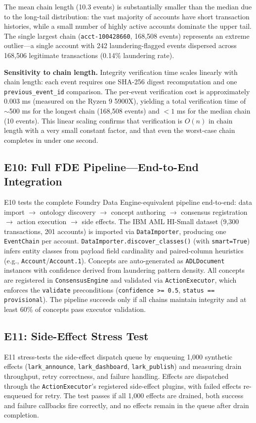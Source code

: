 The mean chain length (10.3 events) is substantially smaller than the median due to the long-tail distribution: the vast majority of accounts have short transaction histories, while a small number of highly active accounts dominate the upper tail. The single largest chain (\texttt{acct-100428660}, 168,508 events) represents an extreme outlier---a single account with 242 laundering-flagged events dispersed across 168,506 legitimate transactions (0.14\% laundering rate).

\textbf{Sensitivity to chain length.} Integrity verification time scales linearly with chain length: each event requires one SHA-256 digest recomputation and one \texttt{previous\_event\_id} comparison. The per-event verification cost is approximately 0.003 ms (measured on the Ryzen 9 5900X), yielding a total verification time of $\sim$500 ms for the longest chain (168,508 events) and \(<1\) ms for the median chain (10 events). This linear scaling confirms that verification is \(O(n)\) in chain length with a very small constant factor, and that even the worst-case chain completes in under one second.


\subsection{E10: Full FDE Pipeline---End-to-End Integration}
\label{e10-full-fde-pipeline}

E10 tests the complete Foundry Data Engine-equivalent pipeline end-to-end: data import $\rightarrow$ ontology discovery $\rightarrow$ concept authoring $\rightarrow$ consensus registration $\rightarrow$ action execution $\rightarrow$ side effects. The IBM AML HI-Small dataset (9,300 transactions, 201 accounts) is imported via \texttt{DataImporter}, producing one \texttt{EventChain} per account. \texttt{DataImporter.discover\_classes()} (with \texttt{smart=True}) infers entity classes from payload field cardinality and paired-column heuristics (e.g., \texttt{Account}/\texttt{Account.1}). Concepts are auto-generated as \texttt{ADLDocument} instances with confidence derived from laundering pattern density. All concepts are registered in \texttt{ConsensusEngine} and validated via \texttt{ActionExecutor}, which enforces the \texttt{validate} preconditions (\texttt{confidence >= 0.5}, \texttt{status == provisional}). The pipeline succeeds only if all chains maintain integrity and at least 60\% of concepts pass executor validation.

\subsection{E11: Side-Effect Stress Test}
\label{e11-side-effect-stress-test}

E11 stress-tests the side-effect dispatch queue by enqueuing 1,000 synthetic effects (\texttt{lark\_announce}, \texttt{lark\_dashboard}, \texttt{lark\_publish}) and measuring drain throughput, retry correctness, and failure handling. Effects are dispatched through the \texttt{ActionExecutor}'s registered side-effect plugins, with failed effects re-enqueued for retry. The test passes if all 1,000 effects are drained, both success and failure callbacks fire correctly, and no effects remain in the queue after drain completion.
